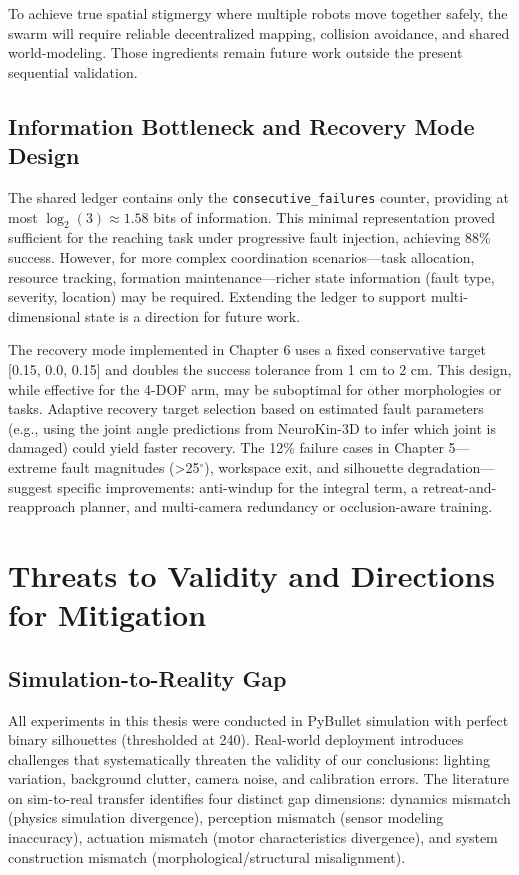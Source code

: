 ﻿\documentclass[12pt,a4paper,oneside]{report}
\begin{document}
To achieve true spatial stigmergy where multiple robots move together safely, the swarm will require reliable decentralized mapping, collision avoidance, and shared world-modeling. Those ingredients remain future work outside the present sequential validation.

\subsection{Information Bottleneck and Recovery Mode Design}

The shared ledger contains only the \texttt{consecutive\_failures} counter, providing at most $\log_2(3) \approx 1.58$ bits of information. This minimal representation proved sufficient for the reaching task under progressive fault injection, achieving 88\% success. However, for more complex coordination scenarios---task allocation, resource tracking, formation maintenance---richer state information (fault type, severity, location) may be required. Extending the ledger to support multi-dimensional state is a direction for future work.

The recovery mode implemented in Chapter 6 uses a fixed conservative target [0.15, 0.0, 0.15] and doubles the success tolerance from 1 cm to 2 cm. This design, while effective for the 4-DOF arm, may be suboptimal for other morphologies or tasks. Adaptive recovery target selection based on estimated fault parameters (e.g., using the joint angle predictions from NeuroKin-3D to infer which joint is damaged) could yield faster recovery. The 12\% failure cases in Chapter 5---extreme fault magnitudes (>25$^\circ$), workspace exit, and silhouette degradation---suggest specific improvements: anti-windup for the integral term, a retreat-and-reapproach planner, and multi-camera redundancy or occlusion-aware training.

\section{Threats to Validity and Directions for Mitigation}

\subsection{Simulation-to-Reality Gap}

All experiments in this thesis were conducted in PyBullet simulation with perfect binary silhouettes (thresholded at 240). Real-world deployment introduces challenges that systematically threaten the validity of our conclusions: lighting variation, background clutter, camera noise, and calibration errors. The literature on sim-to-real transfer \cite{tan2018simtoreal} identifies four distinct gap dimensions: dynamics mismatch (physics simulation divergence), perception mismatch (sensor modeling inaccuracy), actuation mismatch (motor characteristics divergence), and system construction mismatch (morphological/structural misalignment).
\end{document}
